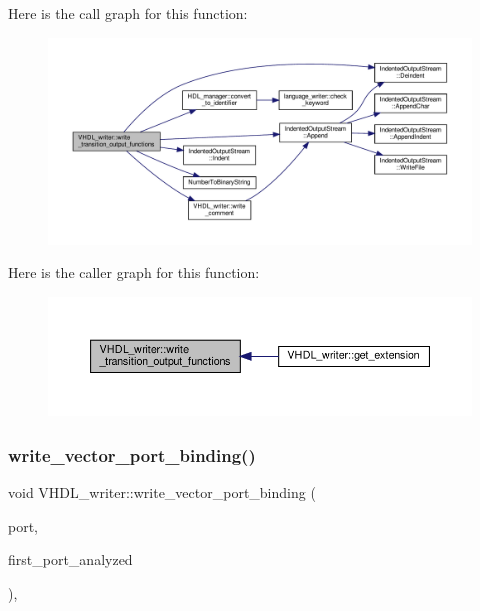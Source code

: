 Here is the call graph for this function\+:
\nopagebreak
\begin{figure}[H]
\begin{center}
\leavevmode
\includegraphics[width=350pt]{d0/d0c/structVHDL__writer_a8a3178b0a3f07604df38e02882851374_cgraph}
\end{center}
\end{figure}
Here is the caller graph for this function\+:
\nopagebreak
\begin{figure}[H]
\begin{center}
\leavevmode
\includegraphics[width=350pt]{d0/d0c/structVHDL__writer_a8a3178b0a3f07604df38e02882851374_icgraph}
\end{center}
\end{figure}
\mbox{\label{structVHDL__writer_a8930dbb88b219d4ab659d65925541684}} 
\subsubsection{\texorpdfstring{write\+\_\+vector\+\_\+port\+\_\+binding()}{write\_vector\_port\_binding()}}
{\footnotesize\ttfamily void V\+H\+D\+L\+\_\+writer\+::write\+\_\+vector\+\_\+port\+\_\+binding (\begin{DoxyParamCaption}\item[{const \hyperlink{structural__objects_8hpp_a8ea5f8cc50ab8f4c31e2751074ff60b2}{structural\+\_\+object\+Ref} \&}]{port,  }\item[{bool \&}]{first\+\_\+port\+\_\+analyzed }\end{DoxyParamCaption})\hspace{0.3cm}{\ttfamily [override]}, {\ttfamily [virtual]}}



